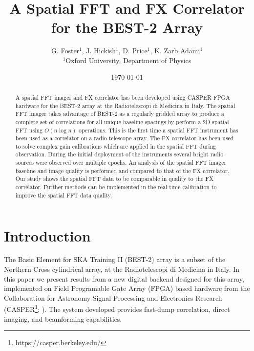 \documentclass[useAMS,macros,usenatbib]{mn2e}
\title[]{A Spatial FFT and FX Correlator for the BEST-2 Array}
\author[G. Foster, J. Hickish, D. Price and K. Zarb Adami]{G. Foster$^{1}$, J. Hickish$^{1}$, D. Price$^{1}$, K. Zarb Adami$^{1}$\\
$^{1}$Oxford University, Department of Physics}
\begin{document}
\date{\today}

\pagerange{\pageref{firstpage}--\pageref{lastpage}} 

\maketitle

\begin{abstract}
A spatial FFT imager and FX correlator has been developed using CASPER FPGA hardware for the BEST-2 array at the Radiotelescopi di Medicina in Italy.
The spatial FFT imager takes advantage of BEST-2 as a regularly gridded array to produce a complete set of correlations for all unique baseline spacings by perform a 2D spatial FFT using $O(n \log n)$ operations.
This is the first time a spatial FFT instrument has been used as a correlator on a radio telescope array.
The FX correlator has been used to solve complex gain calibrations which are applied in the spatial FFT during observation.
During the initial deployment of the instruments several bright radio sources were observed over multiple epochs.
An analysis of the spatial FFT imager baseline and image quality is performed and compared to that of the FX correlator.
Our study shows the spatial FFT data to be comparable in quality to the FX correlator.
Further methods can be implemented in the real time calibration to improve the spatial FFT data quality.
\end{abstract}

\section{Introduction}

The Basic Element for SKA Training II (BEST-2) array is a subset of the Northern Cross cylindrical array, at the Radiotelescopi di Medicina in Italy.
In this paper we present results from a new digital backend designed for this array, implemented on Field Programable Gate Array (FPGA) based hardware from the Collaboration for Astronomy Signal Processing and Electronics Research (CASPER\footnote{https://casper.berkeley.edu/}; \cite{casper}).
The system developed provides fast-dump correlation, direct imaging, and beamforming capabilities.
\end{document}
